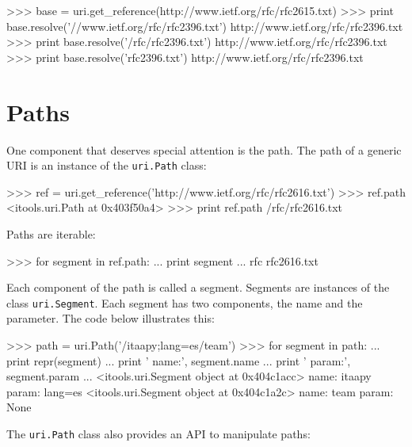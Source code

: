 \begin{code}
    >>> base = uri.get_reference(http://www.ietf.org/rfc/rfc2615.txt)
    >>> print base.resolve('//www.ietf.org/rfc/rfc2396.txt')
    http://www.ietf.org/rfc/rfc2396.txt
    >>> print base.resolve('/rfc/rfc2396.txt')
    http://www.ietf.org/rfc/rfc2396.txt
    >>> print base.resolve('rfc2396.txt')
    http://www.ietf.org/rfc/rfc2396.txt
\end{code}


\section{Paths}

One component that deserves special attention is the path. The path of a
generic URI is an instance of the {\tt uri.Path} class:

\begin{code}
    >>> ref = uri.get_reference('http://www.ietf.org/rfc/rfc2616.txt')
    >>> ref.path
    <itools.uri.Path at 0x403f50a4>
    >>> print ref.path
    /rfc/rfc2616.txt
\end{code}

Paths are iterable:

\begin{code}
    >>> for segment in ref.path:
    ...     print segment
    ... 
    rfc
    rfc2616.txt
\end{code}

Each component of the path is called a segment. Segments are instances of
the class {\tt uri.Segment}. Each segment has two components, the name and
the parameter. The code below illustrates this:

\begin{code}
    >>> path = uri.Path('/itaapy;lang=es/team')
    >>> for segment in path:
    ...     print repr(segment)
    ...     print '  name:', segment.name
    ...     print '  param:', segment.param
    ... 
    <itools.uri.Segment object at 0x404c1acc>
      name: itaapy
      param: lang=es
    <itools.uri.Segment object at 0x404c1a2c>
      name: team
      param: None
\end{code}

The {\tt uri.Path} class also provides an API to manipulate paths:

